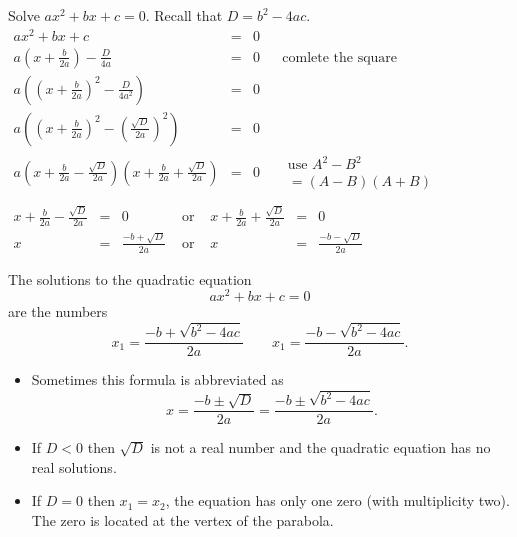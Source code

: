 \begin{frame}
\begin{problem}
Solve $ax^2+bx+c=0$. Recall that $D=b^2-4ac$.
$
\begin{array}{rcll|l}
\displaystyle ax^2+bx+c&=&0 \\
\displaystyle a\left(x +\frac{b }{2a}  \right)- \frac{D}{4a}&=& 0&&\text{comlete the square}\\
\displaystyle a\left(\left(x +\frac{b }{2a} \right)^2- \frac{D}{4a^2}\right)&=& 0\\
\displaystyle a\left(\left(x +\frac{b }{2a} \right)^2- \left( \frac{ \sqrt{D }}{2 a}\right)^2\right)&=& 0\\
\displaystyle a\left(x+\frac{b }{2a}-\frac{\sqrt{D}}{2a} \right)\left(x+\frac{b }{2a}+\frac{\sqrt{D}}{2a} \right)&=&0 &&\begin{array}{l} \text{use } A^2-B^2\\ =(A-B)(A+B)\end{array} \\
\end{array}
$
$
\begin{array}{rclcrcl}
\displaystyle x+\frac{b}{2a}-\frac{\sqrt{D}}{2a}&=&0 &\text{ or } & \displaystyle x+\frac{b}{2a}+\frac{\sqrt{D}}{2a}&=&0\\
x&=&\displaystyle \frac{-b+\sqrt{D}}{2a} & \text{ or } & x&=&\displaystyle \frac{-b-\sqrt{D}}{2a}
\end{array}
$
\end{problem}
\end{frame}
\begin{frame}
\begin{theorem}
The solutions to the quadratic equation 
\[
ax^2+bx+c=0
\]
are the numbers 
\[
x_1=\frac{-b+ \sqrt{b^2-4ac}}{2a} \qquad x_1=\frac{-b- \sqrt{b^2-4ac}}{2a}.
\]
\end{theorem}
\begin{itemize}
\item Sometimes this formula is abbreviated as 
\[
x=\frac{-b\pm \sqrt{D}}{2a}=\frac{-b\pm \sqrt{b^2-4ac}}{2a}.
\]
\item If $D<0$ then $\sqrt{D}$ is not a real number and the quadratic equation has no real solutions.
\item If $D=0$ then $x_1=x_2$, the equation has only one zero (with multiplicity two). The zero is located at the vertex of the parabola.
\end{itemize}
\end{frame}